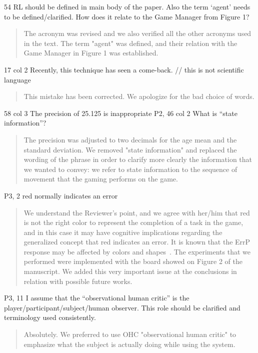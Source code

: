 \documentclass[journal,onecolumn,12pt]{IEEEtran}
\begin{document}
54 RL should be defined in main body of the paper. Also the term ‘agent’ needs to be defined/clarified. How does it relate to the Game Manager from Figure 1?

\begin{quotation}
{\color{blue}
The acronym was revised and we also verified all the other acronyms used in the text.  The term "agent" was defined, and their relation with the Game Manager in Figure 1 was established.
}
\end{quotation}

17 col 2 Recently, this technique has seen a come-back. // this is not scientific language

\begin{quotation}
{\color{blue}
This mistake has been corrected.  We apologize for the bad choice of words.
}
\end{quotation}

58 col 3 The precision of 25.125 is inappropriate P2, 46 col 2 What is “state information”?

\begin{quotation}
{\color{blue}
The precision was adjusted to two decimals for the age mean and the standard deviation.  We removed  "state information" and replaced the wording of the phrase in order to clarify more clearly the information that we wanted to convey:  we refer to state information to the sequence of movement that the gaming performs on the game.
}
\end{quotation}

P3, 2 red normally indicates an error

\begin{quotation}
{\color{blue}
We understand the Reviewer's point, and we agree with her/him that red is not the right color to represent the completion of a task in the game, and in this case it may have cognitive implications regarding the generalized concept that red indicates an error.   It is known that the ErrP response may be affected by colors and shapes~\cite{EIMER1997143}.  The experiments that we performed were implemented with the board showed on Figure 2 of the manuscript.  We added this very important issue at the conclusions in relation with possible future works.
}
\end{quotation}

P3, 11 I assume that the “observational human critic” is the player/participant/subject/human observer. This role should be clarified and terminology used consistently.

\begin{quotation}
{\color{blue}
Absolutely.  We preferred to use OHC "observational human critic" to emphasize what the subject is actually doing while using the system.
}
\end{quotation}
\end{document}
